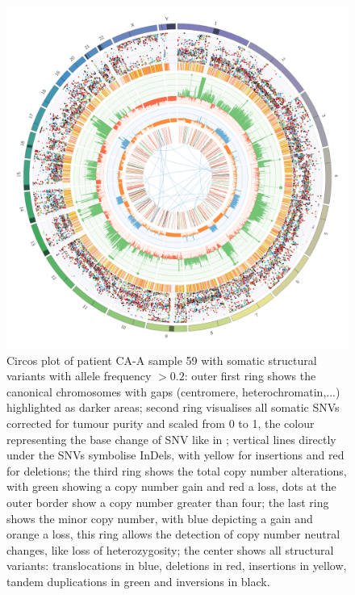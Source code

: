 \begin{figure}[!ht]
\centering
\includegraphics[width=.99\linewidth]{Figures/CASCADE/CA99/CA99-59.circos.png}
\caption[Circos plot of patient CA-A sample 59]{Circos plot of patient CA-A sample 59 with somatic structural variants with allele frequency $> 0.2$: outer first ring shows the canonical chromosomes with gaps (centromere, heterochromatin,...) highlighted as darker areas; second ring visualises all somatic SNVs corrected for tumour purity and scaled from 0 to 1, the colour representing the base change of SNV like in \protect\textcite{Alexandrov2013}; vertical lines directly under the SNVs symbolise InDels, with yellow for insertions and red for deletions; the third ring shows the total copy number alterations, with green showing a copy number gain and red a loss, dots at the outer border show a copy number greater than four; the last ring shows the minor copy number, with blue depicting a gain and orange a loss, this ring allows the detection of copy number neutral changes, like loss of heterozygosity; the center shows all structural variants: translocations in blue, deletions in red, insertions in yellow, tandem duplications in green and inversions in black.} \label{fig:ca99.59circos}
\end{figure}



